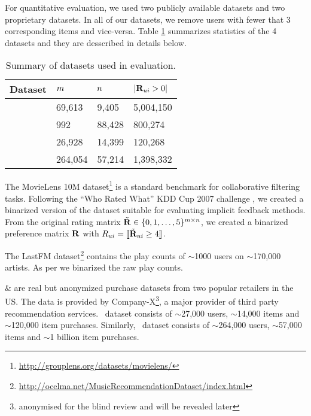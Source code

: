 For quantitative evaluation, we used two publicly available datasets and two proprietary datasets. In all of our datasets, we remove users with fewer
that 3 corresponding items and vice-versa. Table \ref{tbl:datasets} summarizes statistics of the 4 datasets and they are desscribed in details below.

\begin{table}
	\centering
	\caption{Summary of datasets used in evaluation.}
	\label{tbl:datasets}
	
	\begin{tabular}{llll}
	\toprule
	\toprule	
	\textbf{Dataset} & $m$ & $n$ & $ | \mathbf{R}_{ui} > 0 | $ \\
	\toprule
	\MLens  & 69,613 & 9,405 & 5,004,150 \\
	\LastFM & 992 & 88,428 & 800,274\\
	\Guitar & 26,928 & 14,399 & 120,268 \\
	\Lowes & 264,054 & 57,214 & 1,398,332 \\
	\bottomrule
	\end{tabular}
\end{table}

\MLens The MovieLens 10M dataset\footnote{\scriptsize \url{http://grouplens.org/datasets/movielens/}} is a standard benchmark for collaborative filtering tasks.
Following the ``Who Rated What'' KDD Cup 2007 challenge \citep{Bennett:2007}, we created a binarized version of the dataset suitable for evaluating implicit feedback methods.
From the original rating matrix $\tilde{\mathbf{R}} \in \{ 0, 1, \ldots, 5 \}^{m \times n}$, we created a binarized preference matrix $\mathbf{R}$ with $R_{ui} = \llbracket \tilde{\mathbf{R}}_{ui} \geq 4 \rrbracket$.

\LastFM The LastFM dataset\footnote{{\scriptsize \url{http://ocelma.net/MusicRecommendationDataset/index.html}}} \citep{Celma:2008} contains the play counts of $\sim$1000 users on $\sim$170,000 artists. As per \MLens we binarized the raw play counts.


\Guitar \& \Lowes  are real but anonymized purchase datasets from two popular retailers in the US. The data is provided by Company-X\footnote{{\scriptsize anonymised for the blind review and will be revealed later}}, a major provider of third party recommendation services. \Guitar \ dataset consists of $\sim$27,000 users, $\sim$14,000 items and $\sim$120,000 item purchases. Similarly, \Lowes \ dataset consists of $\sim$264,000 users, $\sim$57,000 items and $\sim$1 billion item purchases. 

